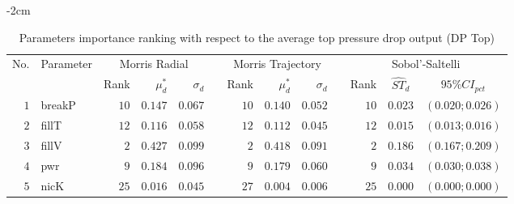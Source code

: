 \begin{table*}[!htbp]\centering
{}
\begin{adjustwidth*}{}{-2cm}
\caption{Parameters importance ranking with respect to the average top pressure drop output (DP Top)}
\label{tab:app_screening_dptop_average}
\begin{tabular}{@{}rlrrrrrrrrrcc@{}}\toprule
\multirow{2}{*}{\footnotesize{No.}} & \multirow{2}{*}{\footnotesize{Parameter}} & \multicolumn{3}{c}{\footnotesize{Morris Radial}} & \phantom{a} & \multicolumn{3}{c}{\footnotesize{Morris Trajectory}}  &\phantom{a}& \multicolumn{3}{c}{\footnotesize{Sobol'-Saltelli}}                               \\             
                                                                                  \cmidrule{3-5}                                                   \cmidrule{7-9}                                                      \cmidrule{11-13}
                                    &                                           & \footnotesize{Rank}   & $\mu^*_d$ & $\sigma_d$   &             & \footnotesize{Rank} & $\mu^*_d$ & $\sigma_d$          &           & \footnotesize{Rank} & \footnotesize{$\hat{ST}_d$} & \footnotesize{$95\%CI_{pct}$}\\ \midrule
\footnotesize{$1 $} & \footnotesize{breakP   } & \footnotesize{$10$} & \footnotesize{$0.147$} & \footnotesize{$0.067$} && \footnotesize{$10$} & \footnotesize{$0.140$} & \footnotesize{$0.052$} && \footnotesize{$10$} & \footnotesize{$0.023$} & \footnotesize{$(0.020;0.026)$} \\
\footnotesize{$2 $} & \footnotesize{fillT    } & \footnotesize{$12$} & \footnotesize{$0.116$} & \footnotesize{$0.058$} && \footnotesize{$12$} & \footnotesize{$0.112$} & \footnotesize{$0.045$} && \footnotesize{$12$} & \footnotesize{$0.015$} & \footnotesize{$(0.013;0.016)$} \\
\footnotesize{$3 $} & \footnotesize{fillV    } & \footnotesize{$2 $} & \footnotesize{$0.427$} & \footnotesize{$0.099$} && \footnotesize{$2 $} & \footnotesize{$0.418$} & \footnotesize{$0.091$} && \footnotesize{$2 $} & \footnotesize{$0.186$} & \footnotesize{$(0.167;0.209)$} \\
\footnotesize{$4 $} & \footnotesize{pwr      } & \footnotesize{$9 $} & \footnotesize{$0.184$} & \footnotesize{$0.096$} && \footnotesize{$9 $} & \footnotesize{$0.179$} & \footnotesize{$0.060$} && \footnotesize{$9 $} & \footnotesize{$0.034$} & \footnotesize{$(0.030;0.038)$} \\
\footnotesize{$5 $} & \footnotesize{nicK     } & \footnotesize{$25$} & \footnotesize{$0.016$} & \footnotesize{$0.045$} && \footnotesize{$27$} & \footnotesize{$0.004$} & \footnotesize{$0.006$} && \footnotesize{$25$} & \footnotesize{$0.000$} & \footnotesize{$(0.000;0.000)$} \\

\end{tabular}
\end{adjustwidth*}
\end{table*}
